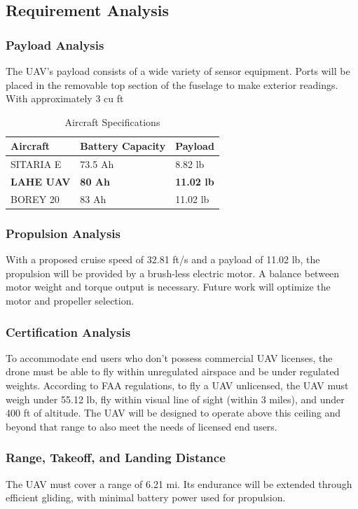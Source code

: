 \documentclass[12pt]{article}
\begin{document}
	\subsection{Requirement Analysis}
	\subsubsection{Payload Analysis}
	The UAV's payload consists of a wide variety of sensor equipment. Ports will be placed in the removable top section of the fuselage to make exterior readings. With approximately 3 cu ft
	
	\begin{table}[h]
		\centering
		\caption{Aircraft Specifications}
		\begin{tabular}{|l|l|l|}
			\hline
			\textbf{Aircraft} & \textbf{Battery Capacity} & \textbf{Payload} \\ 
			\hline
			SITARIA E & 73.5 Ah & 8.82 lb \\ 
			\hline
			\textbf{LAHE UAV} & \textbf{80 Ah} & \textbf{11.02 lb} \\ 
			\hline
			BOREY 20 & 83 Ah & 11.02 lb \\ 
			\hline
		\end{tabular}
	\end{table}
	
	\subsubsection{Propulsion Analysis}
	With a proposed cruise speed of 32.81 ft/s and a payload of 11.02 lb, the propulsion will be provided by a brush-less electric motor. A balance between motor weight and torque output is necessary. Future work will optimize the motor and propeller selection.
	
	\subsubsection{Certification Analysis}
	To accommodate end users who don't possess commercial UAV licenses, the drone must be able to fly within unregulated airspace and be under regulated weights. According to FAA regulations, to fly a UAV unlicensed, the UAV must weigh under 55.12 lb, fly within visual line of sight (within 3 miles), and under 400 ft of altitude. The UAV will be designed to operate above this ceiling and beyond that range to also meet the needs of licensed end users.
	
	\subsubsection{Range, Takeoff, and Landing Distance}
	The UAV must cover a range of 6.21 mi. Its endurance will be extended through efficient gliding, with minimal battery power used for propulsion.
	
\end{document}
